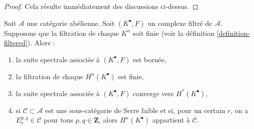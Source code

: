 \begin{proof}
Cela résulte immédiatement des discussions ci-dessus.
\end{proof}

\begin{lemma}
\label{lemma-biregular-ss-converges}
Soit $\mathcal{A}$ une catégorie abélienne. Soit $(K^\bullet, F)$ un
complexe filtré de $\mathcal{A}$. Supposons que la filtration de chaque $K^n$
soit finie (voir la définition \ref{definition-filtered}). Alors :
\begin{enumerate}
\item la suite spectrale associée à $(K^\bullet, F)$ est bornée,
\item la filtration de chaque $H^n(K^\bullet)$ est finie,
\item la suite spectrale associée à $(K^\bullet, F)$ converge
vers $H^*(K^\bullet)$,
\item si $\mathcal{C} \subset \mathcal{A}$ est une sous-catégorie de Serre faible
et si, pour un certain $r$, on a $E_r^{p, q} \in \mathcal{C}$ pour tous
$p, q \in \mathbf{Z}$, alors $H^n(K^\bullet)$ appartient à $\mathcal{C}$.
\end{enumerate}
\end{lemma}

